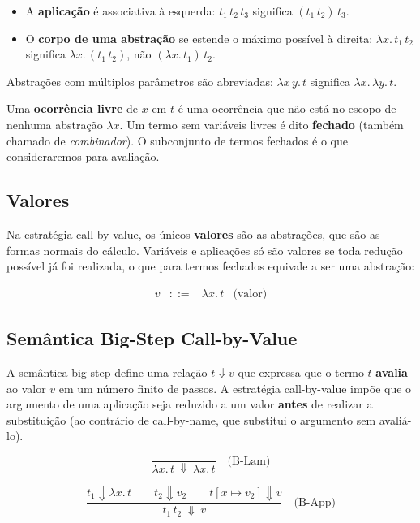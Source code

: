\begin{itemize}
  \item A \textbf{aplicação} é associativa à esquerda: \(t_1\, t_2\,
    t_3\) significa \((t_1\, t_2)\, t_3\).
  \item O \textbf{corpo de uma abstração} se estende o máximo possível à
    direita: \(\lambda x.\, t_1\, t_2\) significa \(\lambda
    x.\,(t_1\, t_2)\), não \((\lambda x.\, t_1)\, t_2\).
\end{itemize}

Abstrações com múltiplos parâmetros são abreviadas: \(\lambda x\,
y.\, t\) significa \(\lambda x.\,\lambda y.\, t\).

Uma \textbf{ocorrência livre} de \(x\) em \(t\) é uma ocorrência que
não está no escopo de nenhuma abstração \(\lambda x\). Um termo sem
variáveis livres é dito \textbf{fechado} (também chamado de
\emph{combinador}). O subconjunto de termos fechados é o que
consideraremos para avaliação.

\subsection{Valores}

Na estratégia call-by-value, os únicos \textbf{valores} são as
abstrações, que são as formas normais do cálculo. Variáveis e
aplicações só são valores se toda redução possível já foi realizada,
o que para termos fechados equivale a ser uma abstração:

\[
  \begin{array}{rcll} v & ::= & \lambda x.\, t & \text{(valor)}
  \end{array}
\]

\subsection{Semântica Big-Step Call-by-Value}

A semântica big-step define uma relação \(t \Downarrow v\) que
expressa que o termo \(t\) \textbf{avalia} ao valor \(v\) em um
número finito de passos. A estratégia call-by-value impõe que o
argumento de uma aplicação seja reduzido a um valor \textbf{antes} de
realizar a substituição (ao contrário de call-by-name, que substitui
o argumento sem avaliá-lo).

\[ \dfrac{}{\lambda x.\, t\ \Downarrow\ \lambda x.\, t} \quad\text{(B-Lam)}
\]

\[ \dfrac{ t_1 \Downarrow \lambda x.\, t \qquad t_2 \Downarrow v_2 \qquad t[x
\mapsto v_2] \Downarrow v }{ t_1\, t_2\ \Downarrow\ v } \quad\text{(B-App)} \]

